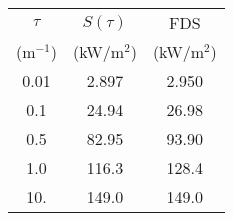 \begin{center}
\begin{tabular}{|c|c|c|} \hline
$\tau$      & $S(\tau)$   & FDS \\
(m$^{-1}$)  & (kW/m$^2$)  & (kW/m$^2$) \\ \hline\hline
0.01        & 2.897       &2.950 \\
0.1         & 24.94       &26.98 \\
0.5         & 82.95       &93.90 \\
1.0         & 116.3       &128.4 \\
10.         & 149.0       &149.0 \\ \hline
\end{tabular}
\end{center}
